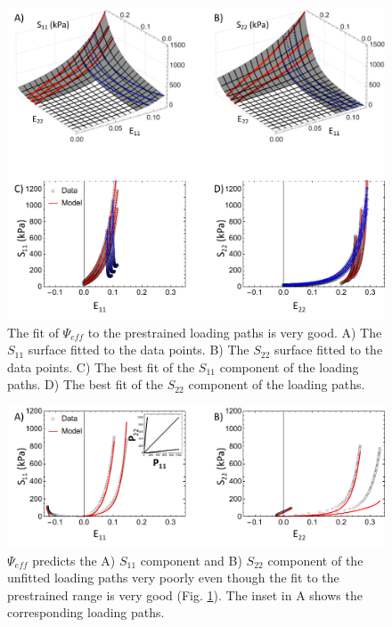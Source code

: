 \begin{figure}[hptb]
\centering
\includegraphics[width=\textwidth]{Images/chapter5/effphyfit}
\caption{The fit of $\Psi_{eff}$ to the prestrained loading paths is very good. A) The $S_{11}$ surface fitted to the data points. B) The $S_{22}$ surface fitted to the data points. C) The best fit of the $S_{11}$ component of the loading paths. D) The best fit of the $S_{22}$ component of the loading paths.}
\label{fig:effphyfit}
\end{figure} 

\begin{figure}[hptb]
\centering
\includegraphics[width=\textwidth]{Images/chapter5/effphypred}
\caption{$\Psi_{eff}$ predicts the A) $S_{11}$ component and B) $S_{22}$ component of the unfitted loading paths very poorly even though the fit to the prestrained range is very good (Fig. \ref{fig:effphyfit}). The inset in A shows the corresponding loading paths.}
\label{fig:effphypred}
\end{figure} 


